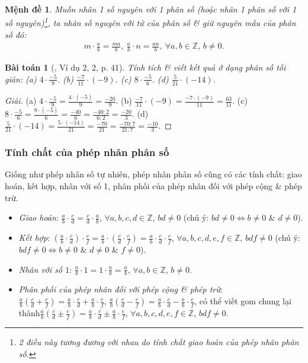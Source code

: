 \documentclass{article}
\newtheorem{baitoan}{Bài toán}
\newtheorem{menhde}{Mệnh đề}
\begin{document}
\begin{menhde}
	Muốn nhân 1 số nguyên với 1 phân số (hoặc nhân 1 phân số với 1 số nguyên)\footnote{2 điều này tương đương với nhau do tính chất giao hoán của phép nhân phân số.}, ta nhân số nguyên với tử của phân số \& giữ nguyên mẫu của phân số đó:
	\begin{align*}
		m\cdot\frac{a}{b} = \frac{ma}{b},\ \frac{a}{b}\cdot n = \frac{an}{b},\ \forall a,b\in\mathbb{Z},\,b\ne0.
	\end{align*}
\end{menhde}

\begin{baitoan}[\cite{SGK_Toan_6_Canh_Dieu_tap_2}, Ví dụ 2, 2, p. 41]
	Tính tích \& viết kết quả ở dạng phân số tối giản: (a) $4\cdot\frac{-5}{9}$. (b) $\frac{-7}{11}\cdot(-9)$. (c) $8\cdot\frac{-5}{6}$. (d) $\frac{5}{21}\cdot(-14)$.
\end{baitoan}

\begin{proof}[Giải]
	(a) $4\cdot\frac{-5}{9} = \frac{4\cdot(-5)}{9} = \frac{-20}{9}$. (b) $\frac{-7}{11}\cdot(-9) = \frac{-7\cdot(-9)}{11} = \frac{63}{11}$. (c) $8\cdot\frac{-5}{6} = \frac{8\cdot(-5)}{6} = \frac{-40}{6} = \frac{-40:2}{6:2} = \frac{-20}{3}$. (d) $\frac{5}{21}\cdot(-14) = \frac{5\cdot(-14)}{21} = \frac{-70}{21} = \frac{-70:7}{21:7} = \frac{-10}{3}$.
\end{proof}

\subsubsection{Tính chất của phép nhân phân số}
Giống như phép nhân số tự nhiên, phép nhân phân số cũng có các tính chất: giao hoán, kết hợp, nhân với số 1, phân phối của phép nhân đối với phép cộng \& phép trừ.
\begin{itemize}
	\item \textit{Giao hoán}: $\frac{a}{b}\cdot\frac{c}{d} =  \frac{c}{d}\cdot\frac{a}{b}$, $\forall a,b,c,d\in\mathbb{Z}$, $bd\ne0$ (chú ý: $bd\ne0\Leftrightarrow b\ne0$ \& $d\ne0$).
	\item \textit{Kết hợp}: $\left(\frac{a}{b}\cdot\frac{c}{d}\right)\cdot\frac{e}{f} = \frac{a}{b}\cdot\left(\frac{c}{d}\cdot\frac{e}{f}\right) = \frac{a}{b}\cdot\frac{c}{d}\cdot\frac{e}{f}$, $\forall a,b,c,d,e,f\in\mathbb{Z}$, $bdf\ne0$ (chú ý: $bdf\ne0\Leftrightarrow b\ne0$ \& $d\ne0$ \& $f\ne0$).
	\item \textit{Nhân với số $1$}: $\frac{a}{b}\cdot1 = 1\cdot\frac{a}{b} = \frac{a}{b}$, $\forall a,b\in\mathbb{Z}$, $b\ne0$.
	\item \textit{Phân phối của phép nhân đối với phép cộng \& phép trừ}: $\frac{a}{b}\left(\frac{c}{d} + \frac{e}{f}\right) = \frac{a}{b}\cdot\frac{c}{d} + \frac{a}{b}\cdot\frac{e}{f}$, $\frac{a}{b}\left(\frac{c}{d} - \frac{e}{f}\right) = \frac{a}{b}\cdot\frac{c}{d} - \frac{a}{b}\cdot\frac{e}{f}$, có thể viết gom chung lại thành$\frac{a}{b}\left(\frac{c}{d}\pm\frac{e}{f}\right) = \frac{a}{b}\cdot\frac{c}{d}\pm\frac{a}{b}\cdot\frac{e}{f}$, $\forall a,b,c,d,e,f\in\mathbb{Z}$, $bdf\ne0$.
\end{itemize}
\end{document}
